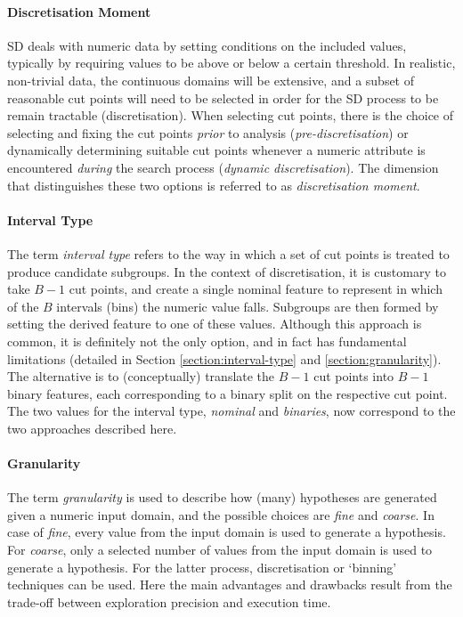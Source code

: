 \documentclass[smallextended]{svjour3}
\newcommand{\dimension}{\emph}
\newcommand{\parameter}{\emph}
\newcommand{\dyndis}{\parameter{dynamic discretisation}}
\newcommand{\predis}{\parameter{pre-discretisation}}
\newcommand{\binaries}{\parameter{binaries}}
\newcommand{\nominal}{\parameter{nominal}}
\newcommand{\fine}{\parameter{fine}}
\newcommand{\coarse}{\parameter{coarse}}
\newcommand{\sd}{SD}
\begin{document}
\paragraph{Discretisation Moment}
\sd{} deals with numeric data by setting conditions on the included values, typically by requiring values to be above or below a certain threshold.
In realistic, non-trivial data, the continuous domains will be extensive, and a subset of reasonable cut points will need to be selected in order for the \sd{} process to be remain tractable (discretisation).
When selecting cut points, there is the choice of selecting and fixing the cut points \emph{prior} to analysis (\predis{}) or dynamically determining suitable cut points whenever a numeric attribute is encountered \emph{during} the search process (\dyndis{}).
The dimension that distinguishes these two options is referred to as \dimension{discretisation moment}.

\paragraph{Interval Type}
The term \dimension{interval type} refers to the way in which a set of cut points is treated to produce candidate subgroups.
In the context of discretisation, it is customary to take $B{-}1$ cut points, and create a single nominal feature to represent in which of the $B$ intervals (bins) the numeric value falls.
Subgroups are then formed by setting the derived feature to one of these values.
Although this approach is common, it is definitely not the only option, and in fact has fundamental limitations (detailed in Section \ref{section:interval-type} and \ref{section:granularity}).
The alternative is to (conceptually) translate the $B{-}1$ cut points into $B{-}1$ binary features, each corresponding to a binary split on the respective cut point.
The two values for the interval type, \nominal{} and \binaries{}, now correspond to the two approaches described here.

\paragraph{Granularity}
The term \dimension{granularity} is used to describe how (many) hypotheses are generated given a numeric input domain, and the possible choices are \fine{} and \coarse{}.
In case of \fine{}, every value from the input domain is used to generate a hypothesis.
For \coarse{}, only a selected number of values from the input domain is used to generate a hypothesis.
For the latter process, discretisation or `binning' techniques can be used.
Here the main advantages and drawbacks result from the trade-off between exploration precision and execution time.
\end{document}
